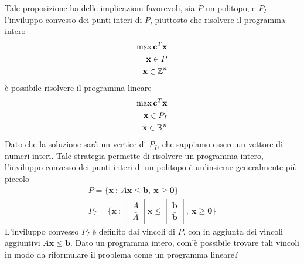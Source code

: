 \documentclass[10pt, letterpaper]{report}
\newcommand{\bb}{{\mathbf{b}}}
\newcommand{\bc}{{\mathbf{c}}}
\newcommand{\x}{{\mathbf{x}}}
\begin{document}
\noindent Tale proposizione ha delle implicazioni favorevoli, sia $P$ un politopo, e $P_I$ l'inviluppo convesso dei punti interi di $P$, piuttosto che risolvere il programma intero 
\begin{eqnarray*}
    \max \bc^T\x\\ \x\in P \\ \x\in\Z^n
\end{eqnarray*}
è possibile risolvere il programma lineare
\begin{eqnarray*}
    \max \bc^T\x\\ \x\in P_I \\ \x\in\R^n
\end{eqnarray*}
Dato che la soluzione sarà un vertice di $P_I$, che sappiamo essere un vettore di numeri interi. Tale strategia permette di risolvere un programma intero, l'inviluppo convesso dei punti interi di un politopo è un'insieme generalmente più piccolo \begin{eqnarray*}
    P=\{\x \ : \ A\x\le\bb, \ \x\ge\mathbf 0\}\\ 
    P_I=\Big\{\x \ : \ \begin{bmatrix}
    A\\ \bar A
    \end{bmatrix}\x\le\begin{bmatrix}
    \bb\\ \bar \bb
    \end{bmatrix}, \ \x\ge\mathbf 0\Big\}
\end{eqnarray*}
L'inviluppo convesso $P_I$ è definito dai vincoli di $P$, con in aggiunta dei vincoli aggiuntivi $\bar A \x\le \bar \bb$. Dato un programma intero, com'è possibile trovare tali vincoli in modo da riformulare il problema come un programma lineare?
\end{document}
